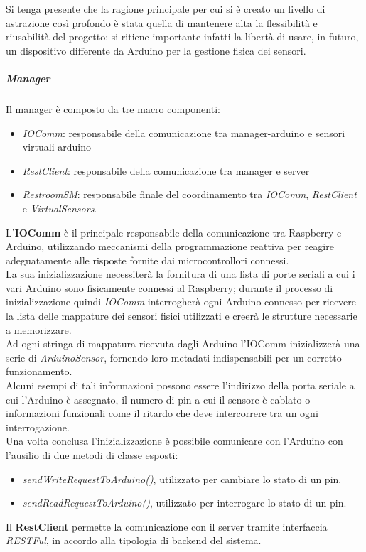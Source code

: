 \documentclass[12pt]{article}
\begin{document}
Si tenga presente che la ragione principale per cui si è creato un livello di astrazione così profondo è stata quella di mantenere alta la flessibilità e riusabilità del progetto: si ritiene importante infatti la libertà di usare, in futuro, un dispositivo differente da Arduino per la gestione fisica dei sensori. 
\subparagraph{Manager}
Il manager è composto da tre macro componenti:
\begin{itemize}
\item \textit{IOComm}: responsabile della comunicazione tra manager-arduino e sensori virtuali-arduino
\item \textit{RestClient}: responsabile della comunicazione tra manager e server
\item \textit{RestroomSM}: responsabile finale del coordinamento tra \textit{IOComm}, \textit{RestClient} e \textit{VirtualSensors}.
\end{itemize}
L'\textbf{IOComm} è il principale responsabile della comunicazione tra Raspberry e Arduino, utilizzando meccanismi della programmazione reattiva per reagire adeguatamente alle risposte fornite dai microcontrollori connessi.\\
La sua inizializzazione necessiterà la fornitura di una lista di porte seriali a cui i vari Arduino sono fisicamente connessi al Raspberry; durante il processo di inizializzazione quindi \textit{IOComm} interrogherà ogni Arduino connesso per ricevere la lista delle mappature dei sensori fisici utilizzati e creerà le strutture necessarie a memorizzare.\\ 
Ad ogni stringa di mappatura ricevuta dagli Arduino l'IOComm inizializzerà una serie di \textit{ArduinoSensor}, fornendo loro metadati indispensabili per un corretto funzionamento.\\
Alcuni esempi di tali informazioni possono essere l'indirizzo della porta seriale a cui l'Arduino è assegnato, il numero di pin a cui il sensore è cablato o informazioni funzionali come il ritardo che deve intercorrere tra un ogni interrogazione.\\
Una volta conclusa l'inizializzazione è possibile comunicare con l'Arduino con l'ausilio di due metodi di classe esposti:
\begin{itemize}
\item \textit{sendWriteRequestToArduino()}, utilizzato per cambiare lo stato di un pin.
\item \textit{sendReadRequestToArduino()}, utilizzato per interrogare lo stato di un pin.
\end{itemize}
Il \textbf{RestClient} permette la comunicazione con il server tramite interfaccia \textit{RESTFul}, in accordo alla tipologia di backend del sistema.\\
\end{document}
